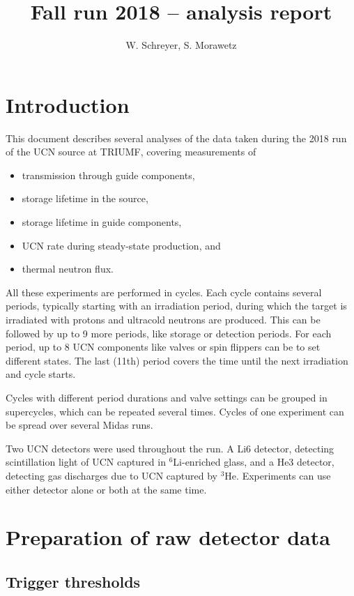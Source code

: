 \documentclass[10pt,letterpaper]{article}
\author{W. Schreyer, S. Morawetz}
\title{Fall run 2018 -- analysis report}
\begin{document}
\maketitle

\tableofcontents

\section{Introduction}

This document describes several analyses of the data taken during the 2018 run of the UCN source at TRIUMF, covering measurements of
\begin{itemize}
\item transmission through guide components,
\item storage lifetime in the source,
\item storage lifetime in guide components,
\item UCN rate during steady-state production, and
\item thermal neutron flux.
\end{itemize}

All these experiments are performed in cycles. Each cycle contains several periods, typically starting with an irradiation period, during which the target is irradiated with protons and ultracold neutrons are produced. This can be followed by up to 9 more periods, like storage or detection periods. For each period, up to 8 UCN components like valves or spin flippers can be to set different states. The last (11th) period covers the time until the next irradiation and cycle starts.

Cycles with different period durations and valve settings can be grouped in supercycles, which can be repeated several times. Cycles of one experiment can be spread over several Midas runs.

Two UCN detectors were used throughout the run. A Li6 detector, detecting scintillation light of UCN captured in $^6$Li-enriched glass, and a He3 detector, detecting gas discharges due to UCN captured by $^3$He. Experiments can use either detector alone or both at the same time.


\section{Preparation of raw detector data}

\subsection{Trigger thresholds}
\end{document}
